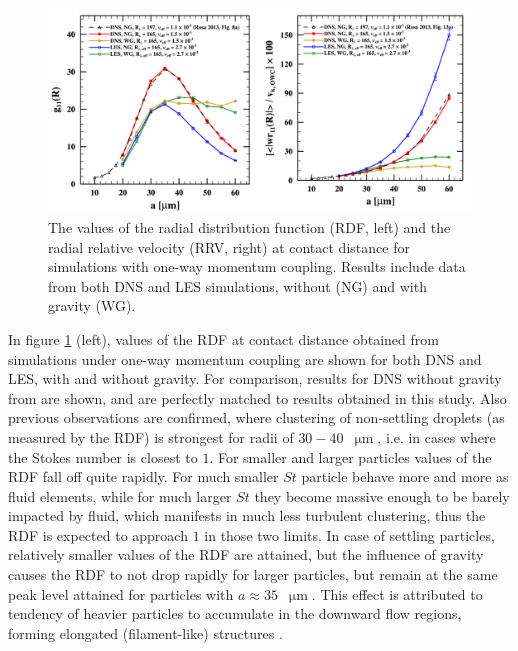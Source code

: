 \documentclass{pracamgren}
\begin{document}
\begin{figure}[h]
\centering
\includegraphics[width=13.5cm]{img/plots/2-2-1-owcrdfrrv.pdf}
\caption{
The values of the radial distribution function (RDF, left) and the radial relative velocity (RRV, right) at contact distance for simulations with one-way momentum coupling.
Results include data from both DNS and LES simulations, without (NG) and with gravity (WG).
}
\label{fig:owcrdfrrv}
\end{figure}

In figure \ref{fig:owcrdfrrv} (left), values of the RDF at contact distance obtained from simulations under one-way momentum coupling are shown for both DNS and LES, with and without gravity.
For comparison, results for DNS without gravity from \textcite{Rosa2013} are shown, and are perfectly matched to results obtained in this study.
Also previous observations are confirmed, where clustering of non-settling droplets (as measured by the RDF) is strongest for radii of $30-40$~$\upmu\text{m}$, i.e. in cases where the Stokes number is closest to $1$.
For smaller and larger particles values of the RDF fall off quite rapidly.
For much smaller $St$ particle behave more and more as fluid elements, while for much larger $St$ they become massive enough to be barely impacted by fluid, which manifests in much less turbulent clustering, thus the RDF is expected to approach $1$ in those two limits.
In case of settling particles, relatively smaller values of the RDF are attained, but the influence of gravity causes the RDF to not drop rapidly for larger particles, but remain at the same peak level attained for particles with $a \approx 35$~$\upmu\text{m}$. 
This effect is attributed to tendency of heavier particles to accumulate in the downward flow regions, forming elongated (filament-like) structures \parencite{Rosa2015}. 
\end{document}
